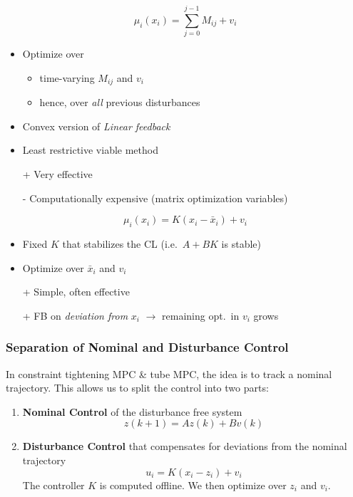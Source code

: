 \newpar{}
\begin{equation*}
    \mu_i(x_i) = \sum_{j=0}^{j-1} M_{ij} + v_i
\end{equation*}
\begin{itemize}
    \item Optimize over
          \begin{itemize}
              \item time-varying $M_{ij}$ and $v_i$
              \item hence, over \textit{all} previous disturbances
          \end{itemize}
    \item Convex version of \textit{Linear feedback}
    \item Least restrictive viable method
    \item [+] Very effective
    \item [-] Computationally expensive (matrix optimization variables)
\end{itemize}

\newpar{}
\begin{equation*}
    \mu_i(x_i) = K(x_i - \bar{x}_i) + v_i
\end{equation*}
\begin{itemize}
    \item Fixed $K$ that stabilizes the CL (i.e.\ $A + BK$ is stable)
    \item Optimize over $\bar{x}_i$ and $v_i$
    \item [+] Simple, often effective
    \item [+] FB on \textit{deviation from} $x_i$ $\rightarrow$ remaining opt.\ in $v_i$ grows
\end{itemize}

\subsubsection{Separation of Nominal and Disturbance Control}
In constraint tightening MPC \& tube MPC, the idea is to track a nominal trajectory. This allows us to split the control into two parts:
\begin{enumerate}
    \item \textbf{Nominal Control} of the disturbance free system
          \begin{equation*}
              z(k+1) = Az(k) + Bv(k)
          \end{equation*}
    \item \textbf{Disturbance Control} that compensates for deviations from the nominal trajectory
          \begin{equation*}
              u_i = K(x_i - z_i) + v_i
          \end{equation*}
          The controller $K$ is computed offline. We then optimize over $z_i$ and $v_i$.
\end{enumerate}

